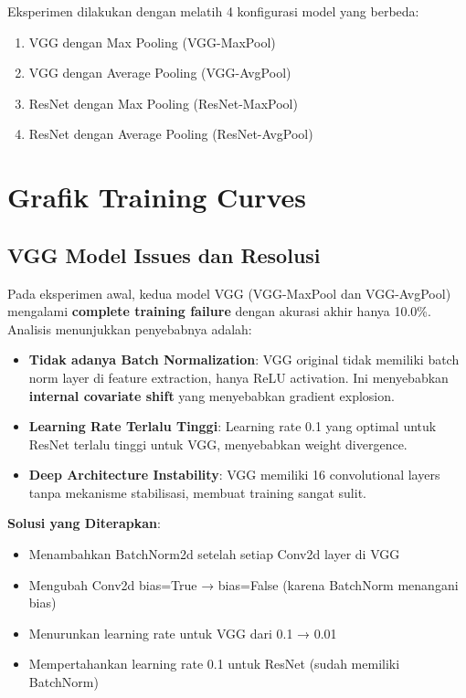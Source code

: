 \documentclass[12pt,a4paper]{report}
\begin{document}
Eksperimen dilakukan dengan melatih 4 konfigurasi model yang berbeda:
\begin{enumerate}
    \item VGG dengan Max Pooling (VGG-MaxPool)
    \item VGG dengan Average Pooling (VGG-AvgPool)
    \item ResNet dengan Max Pooling (ResNet-MaxPool)
    \item ResNet dengan Average Pooling (ResNet-AvgPool)
\end{enumerate}

\section{Grafik Training Curves}

\subsection{VGG Model Issues dan Resolusi}

Pada eksperimen awal, kedua model VGG (VGG-MaxPool dan VGG-AvgPool) mengalami \textbf{complete training failure} dengan akurasi akhir hanya 10.0\%. Analisis menunjukkan penyebabnya adalah:

\begin{itemize}
    \item \textbf{Tidak adanya Batch Normalization}: VGG original tidak memiliki batch norm layer di feature extraction, hanya ReLU activation. Ini menyebabkan \textbf{internal covariate shift} yang menyebabkan gradient explosion.
    
    \item \textbf{Learning Rate Terlalu Tinggi}: Learning rate 0.1 yang optimal untuk ResNet terlalu tinggi untuk VGG, menyebabkan weight divergence.
    
    \item \textbf{Deep Architecture Instability}: VGG memiliki 16 convolutional layers tanpa mekanisme stabilisasi, membuat training sangat sulit.
\end{itemize}

\textbf{Solusi yang Diterapkan}:

\begin{itemize}
    \item Menambahkan BatchNorm2d setelah setiap Conv2d layer di VGG
    \item Mengubah Conv2d bias=True → bias=False (karena BatchNorm menangani bias)
    \item Menurunkan learning rate untuk VGG dari 0.1 → 0.01
    \item Mempertahankan learning rate 0.1 untuk ResNet (sudah memiliki BatchNorm)
\end{itemize}
\end{document}
